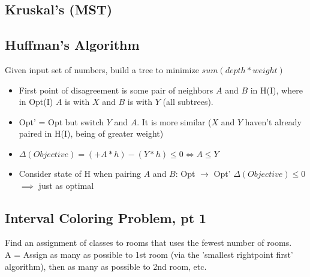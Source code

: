 \documentclass[12pt]{article}
\providecommand{\tightlist}{
    \setlength{\itemsep}{0pt}\setlength{\parskip}{0pt}
}
\begin{document}
\subsection{Kruskal's (MST)}



\subsection{Huffman's Algorithm}
Given input set of numbers, build a tree to minimize $sum(depth * weight)$\\
\begin{itemize}\tightlist
  \item First point of disagreement is some pair of neighbors $A$ and $B$ in H(I), where in Opt(I) $A$ is with $X$ and $B$ is with $Y$ (all subtrees).
  \item Opt' = Opt but switch $Y$ and $A$. It is more similar ($X$ and $Y$ haven't already paired in H(I), being of greater weight)
  \item $\Delta(Objective) = (+A*h) - (Y*h) \leq 0 \iff A \leq Y$
  \item Consider state of H when pairing $A$ and $B$: Opt $\rightarrow$ Opt' $\Delta(Objective) \leq 0$ $\implies$ just as optimal
\end{itemize}


\subsection{Interval Coloring Problem, pt 1}
Find an assignment of classes to rooms that uses the fewest number of rooms.\\
A = Assign as many as possible to 1st room (via the 'smallest rightpoint first' algorithm), then as many as possible to 2nd room, etc.
\end{document}
